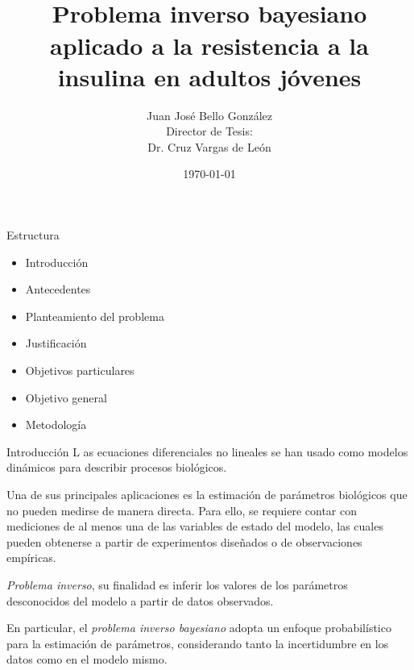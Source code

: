 \documentclass{beamer}
\title{\\
\vspace{0.4mm}
Problema inverso bayesiano aplicado a la resistencia a la insulina en adultos jóvenes\\
\vspace{0.4mm}
}
\author{Juan José Bello González\\ Director de Tesis:\\ Dr. Cruz Vargas de León}
\date{\today}
\begin{document}
	
	\begin{frame}
		\titlepage
	\end{frame}


\begin{frame}{Estructura}
    \begin{itemize}
        \item Introducción
        \vspace{0.3cm}
        \item Antecedentes
        \vspace{0.3cm}
        \item Planteamiento del problema
        \vspace{0.3cm}
        \item Justificación
        \vspace{0.3cm}
        \item Objetivos particulares
        \vspace{0.3cm}
        \item Objetivo general
        \vspace{0.3cm}
        \item Metodología
    \end{itemize}
\end{frame}

	\begin{frame}{Introducción}
		\justifying
		{\calligra L} as ecuaciones diferenciales no lineales se han usado como modelos dinámicos para describir procesos biológicos.\\
		
		\vspace{0.2cm}
		
		Una de sus principales aplicaciones es la estimación de parámetros biológicos que no pueden medirse de manera directa. Para ello, se requiere contar con mediciones de al menos una de las variables de estado del modelo, las cuales pueden obtenerse a partir de experimentos diseñados o de observaciones empíricas.\\
		
		\vspace{0.2cm}
		
		\textit{Problema inverso}, su finalidad es inferir los valores de los parámetros desconocidos del modelo a partir de datos observados.\\
		
		\vspace{0.2cm}
		
		En particular, el \textit{problema inverso bayesiano} adopta un enfoque probabilístico para la estimación de parámetros, considerando tanto la incertidumbre en los datos como en el modelo mismo.
		
	\end{frame}
\end{document}
